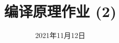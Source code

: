 \documentclass[a4paper, justified]{tufte-handout}
\title{编译原理作业 (2)}
\date{2021年11月12日}
\begin{document}
\maketitle
\noplagiarism %
\begin{abstract}
\end{abstract}
\beginrequired
\end{document}

